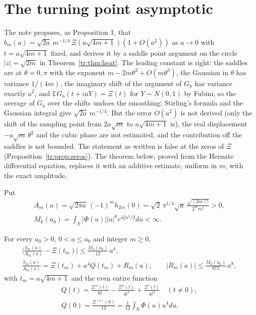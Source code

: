 \section{The turning point asymptotic}\label{tr:sec:saddle}

The note proposes, as Proposition 1, that $b_m(a)=\sqrt{2a}\,m^{-1/4}\,\Xi(a\sqrt{4m+1})(1+O(a^2))$ as $a\to0$ with $t=a\sqrt{4m+1}$ fixed, and derives it by a saddle point argument on the circle $|z|=\sqrt{2m}$ in Theorem~\ref{tr:thm:heat}. The leading constant is right: the saddles are at $\theta=0,\pi$ with the exponent $m-2m\theta^2+O(m\theta^3)$, the Gaussian in $\theta$ has variance $1/(4m)$, the imaginary shift of the argument of $G_a$ has variance exactly $a^2$, and $\mathbb EG_a(t+iaY)=\Xi(t)$ for $Y\sim N(0,1)$ by Fubini, so the average of $G_a$ over the shifts undoes the smoothing; Stirling's formula and the Gaussian integral give $\sqrt{2a}\,m^{-1/4}$. But the error $O(a^2)$ is not derived (only the shift of the sampling point from $2a\sqrt m$ to $a\sqrt{4m+1}$ is), the real displacement $-a\sqrt m\,\theta^2$ and the cubic phase are not estimated, and the contribution off the saddles is not bounded. The statement as written is false at the zeros of $\Xi$ (Proposition~\ref{tr:prop:zeros}). The theorem below, proved from the Hermite differential equation, replaces it with an additive estimate, uniform in $m$, with the exact amplitude.

Put
\begin{gather*}
A_m(a)=\sqrt{2\pi a}\,(-1)^mh_{2m}(0)=\sqrt2\,\pi^{1/4}\sqrt a\,\frac{\sqrt{(2m)!}}{2^mm!}>0 ,\\
M_k(a_0)=\int_{\mathbb R}|\Phi(u)||u|^ke^{a_0^2u^2/2}du<\infty .
\end{gather*}

\begin{theorem}\label{tr:thm:herm}
For every $a_0>0$, $0<a\le a_0$ and integer $m\ge0$,
\begin{gather*}
\Big|\frac{b_m(a)}{A_m(a)}-\Xi(t_m)\Big|\le\frac{M_4(a_0)}{12}\,a^4,\\
\frac{b_m(a)}{A_m(a)}=\Xi(t_m)+a^4Q(t_m)+R_m(a),\qquad|R_m(a)|\le\frac{M_8(a_0)}{672}\,a^8,
\end{gather*}
with $t_m=a\sqrt{4m+1}$ and the even entire function
\begin{gather*}
Q(t)=\frac{\Xi'''(t)}{6t}-\frac{\Xi''(t)}{4t^2}+\frac{\Xi'(t)}{4t^3}\quad(t\ne0),\\
Q(0)=\frac{\Xi^{(4)}(0)}{12}=\frac1{12}\int_{\mathbb R}\Phi(u)u^4du .
\end{gather*}
\end{theorem}

